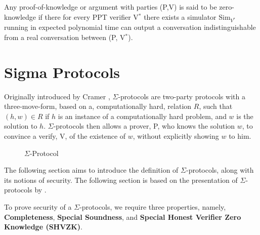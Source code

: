 \begin{definition}
  \label{def:zk}
  Any proof-of-knowledge or argument with parties (P,V) is said to be
  zero-knowledge if there for every PPT verifier V$^{*}$ there exists a
  simulator $\text{Sim}_{V^{*}}$ running in expected polynomial time can output a
  conversation indistinguishable from a real conversation between (P, V$^{*}$).
\end{definition}


\section{Sigma Protocols}
\label{sec:background:sigma_protocols}
Originally introduced by Cramer , $\Sigma$-protocols are
two-party protocols with a three-move-form, based on a, computationally hard,
relation $R$, such that $(h, w) \in R$ if $h$ is an instance of a
computationally hard problem, and $w$ is the solution to $h$. $\Sigma$-protocols
then allows a prover, P, who knows the solution $w$, to convince a verify, V, of
the existence of $w$, without explicitly showing $w$ to him.


\begin{figure}[ht]
  \centering
  \caption{\label{fig:proto_sigma} $\Sigma$-Protocol}
\end{figure}


The following section aims to introduce the definition of $\Sigma$-protocols,
along with its notions of security. The following section is based on the
presentation of $\Sigma$-protocols by \citet{on-sigma-protocols}.


\begin{definition}
\label{def:sigma:sec}
To prove security of a $\Sigma$-protocols, we require three properties, namely,
\textbf{Completeness}, \textbf{Special Soundness}, and \textbf{Special Honest Verifier Zero Knowledge (SHVZK)}.
\end{definition}

